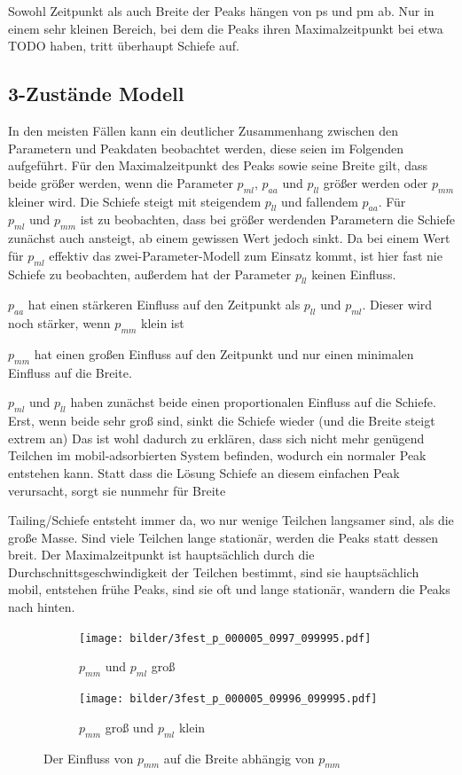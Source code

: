 Sowohl Zeitpunkt als auch Breite der Peaks hängen von ps und pm ab.
Nur in einem sehr kleinen Bereich, bei dem die Peaks ihren Maximalzeitpunkt bei etwa TODO haben, tritt überhaupt Schiefe auf. 


\subsection{3-Zustände Modell}

In den meisten Fällen kann ein deutlicher Zusammenhang zwischen den Parametern und Peakdaten beobachtet werden, diese seien im Folgenden aufgeführt.
Für den Maximalzeitpunkt des Peaks sowie seine Breite gilt, dass beide größer werden, wenn die Parameter $p_{ml}$, $p_{aa}$ und $p_{ll}$ größer werden oder $p_{mm}$ kleiner wird. 
Die Schiefe steigt mit steigendem $p_{ll}$ und fallendem $p_{aa}$. Für $p_{ml} \text{ und } p_{mm}$ ist zu beobachten, dass bei größer werdenden Parametern die Schiefe zunächst auch ansteigt, ab einem gewissen Wert jedoch sinkt. 
Da bei einem Wert für $p_{ml}$ effektiv das zwei-Parameter-Modell zum Einsatz kommt, ist hier fast nie Schiefe zu beobachten, außerdem hat der Parameter $p_{ll}$ keinen Einfluss. 


$p_{aa}$ hat einen stärkeren Einfluss auf den Zeitpunkt als $p_{ll}$ und $p_{ml}$. Dieser wird noch stärker, wenn $p_{mm}$ klein ist

$p_{mm}$ hat einen großen Einfluss auf den Zeitpunkt und nur einen minimalen Einfluss auf die Breite.

$p_{ml}$ und $p_{ll}$ haben zunächst beide einen proportionalen Einfluss auf die Schiefe. Erst, wenn beide sehr groß sind, sinkt die Schiefe wieder (und die Breite steigt extrem an) Das ist wohl dadurch zu erklären, dass sich nicht mehr genügend Teilchen im mobil-adsorbierten System befinden, wodurch ein normaler Peak entstehen kann. Statt dass die Lösung Schiefe an diesem einfachen Peak verursacht, sorgt sie nunmehr für Breite

Tailing/Schiefe entsteht immer da, wo nur wenige Teilchen langsamer sind, als die große Masse. Sind viele Teilchen lange stationär, werden die Peaks statt dessen breit. Der Maximalzeitpunkt ist hauptsächlich durch die Durchschnittsgeschwindigkeit der Teilchen bestimmt, sind sie hauptsächlich mobil, entstehen frühe Peaks, sind sie oft und lange stationär, wandern die Peaks nach hinten.

\begin{figure}[H]
\begin{subfigure}[t]{0.5\textwidth}
\texttt{[image: bilder/3fest\_p\_000005\_0997\_099995.pdf]}
\caption{$p_{mm}$ und $p_{ml}$ groß}
\end{subfigure}
\begin{subfigure}[t]{0.5\textwidth}
\texttt{[image: bilder/3fest\_p\_000005\_09996\_099995.pdf]}
\caption{$p_{mm}$ groß und $p_{ml}$ klein}
\end{subfigure}
\caption{Der Einfluss von $p_{mm}$ auf die Breite abhängig von $p_{mm}$}
\label{einfluss_pmm_1}
\end{figure}

